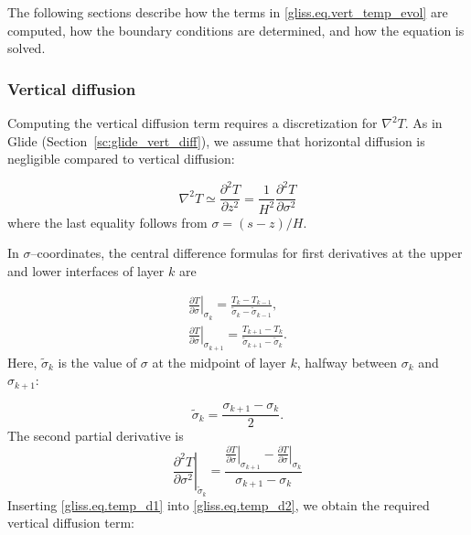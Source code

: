 The following sections describe how the terms in \eqref{gliss.eq.vert_temp_evol} are computed,
how the boundary conditions are determined, and how the equation is solved. 

\subsubsection{Vertical diffusion}

Computing the vertical diffusion term requires a discretization for ${\nabla}^{2}T$.
As in Glide (Section~\ref{sc:glide_vert_diff}), we assume that horizontal diffusion is
negligible compared to vertical diffusion:

\begin{equation}
  {{\nabla }^{2}}T\simeq \frac{{{\partial }^{2}}T}{\partial {{z}^{2}}}=\frac{1}{{{H}^{2}}}\frac{{{\partial }^{2}}T}{\partial {{\sigma }^{2}}}
\end{equation}
%
where the last equality follows from $\sigma = (s-z)/H$.

In $\sigma$--coordinates, the central difference formulas
for first derivatives at the upper and lower interfaces of layer $k$ are

\begin{equation}
  \label{gliss.eq.temp_d1}
  \begin{split}
    {{\left. \frac{\partial T}{\partial \sigma } \right|}_{{{\sigma }_{k}}}} =
    \frac{{{T}_{k}}-{{T}_{k-1}}}{{{{\tilde{\sigma }}}_{k}}-{{{\tilde{\sigma }}}_{k-1}}},\\
    {{\left. \frac{\partial T}{\partial \sigma } \right|}_{{{\sigma }_{k+1}}}} =
    \frac{{{T}_{k+1}}-{{T}_{k}}}{{{{\tilde{\sigma }}}_{k+1}}-{{{\tilde{\sigma }}}_{k}}}.
  \end{split}
\end{equation}
%
Here, $\tilde{\sigma}_k$ is the value of $\sigma$ at the midpoint of layer $k$, 
halfway between $\sigma_{k}$ and $\sigma_{k+1}$:

\begin{equation}
  \tilde{\sigma}_k = \frac{\sigma_{k+1} - \sigma_{k}} {2}.
\end{equation}
%
The second partial derivative is
\begin{equation}
  \label{gliss.eq.temp_d2}
        {{\left. \frac{{{\partial }^{2}}T}{\partial {{\sigma }^{2}}} \right|}_{{{{\tilde{\sigma }}}_{k}}}} =
        \frac{{{\left. \frac{\partial T}{\partial \sigma } \right|}_{{{\sigma }_{k+1}}}} - {{\left. \frac{\partial T}{\partial \sigma } \right|}_{{{\sigma }_{k}}}}} 
             {{{\sigma }_{k+1}}-{{\sigma }_{k}}}
\end{equation}
%
Inserting \eqref{gliss.eq.temp_d1} into \eqref{gliss.eq.temp_d2}, we obtain
the required vertical diffusion term:


